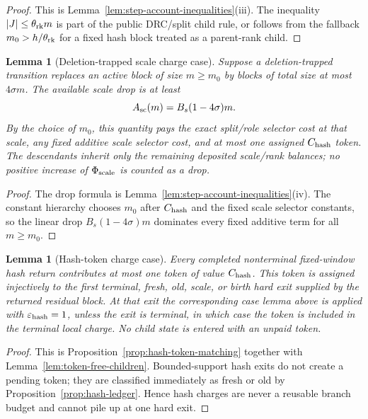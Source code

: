 \documentclass[11pt]{article}
\newtheorem{lemma}[theorem]{Lemma}
\begin{document}
\begin{proof}
This is Lemma~\ref{lem:step-account-inequalities}(iii).  The inequality
$|J|\le\theta_{\rm rk}m$ is part of the public DRC/split child rule, or follows
from the fallback $m_0>h/\theta_{\rm rk}$ for a fixed hash block treated as a
parent-rank child.
\end{proof}

\begin{lemma}[Deletion-trapped scale charge case]
\label{lem:scale-charge-case}
Suppose a deletion-trapped transition replaces an active block of size $m\ge
m_0$ by blocks of total size at most $4\sigma m$.  The available scale drop is
at least
\[
  A_{\rm sc}(m)=B_s(1-4\sigma)m .
\]
By the choice of $m_0$, this quantity pays the exact split/role selector cost
at that scale, any fixed additive scale selector cost, and at most one assigned
$C_{\rm hash}$ token.  The descendants inherit only the remaining deposited
scale/rank balances; no positive increase of $\Phi_{\rm scale}$ is counted as a
drop.
\end{lemma}

\begin{proof}
The drop formula is Lemma~\ref{lem:step-account-inequalities}(iv).  The
constant hierarchy chooses $m_0$ after $C_{\rm hash}$ and the fixed scale
selector constants, so the linear drop $B_s(1-4\sigma)m$ dominates every fixed
additive term for all $m\ge m_0$.
\end{proof}

\begin{lemma}[Hash-token charge case]
\label{lem:hash-token-charge-case}
Every completed nonterminal fixed-window hash return contributes at most one
token of value $C_{\rm hash}$.  This token is assigned injectively to the first
terminal, fresh, old, scale, or birth hard exit supplied by the returned
residual block.  At that exit the corresponding case lemma above is applied
with $\varepsilon_{\rm hash}=1$, unless the exit is terminal, in which case the
token is included in the terminal local charge.  No child state is entered with
an unpaid token.
\end{lemma}

\begin{proof}
This is Proposition~\ref{prop:hash-token-matching} together with
Lemma~\ref{lem:token-free-children}.  Bounded-support hash exits do not create a
pending token; they are classified immediately as fresh or old by
Proposition~\ref{prop:hash-ledger}.  Hence hash charges are never a reusable
branch budget and cannot pile up at one hard exit.
\end{proof}
\end{document}
